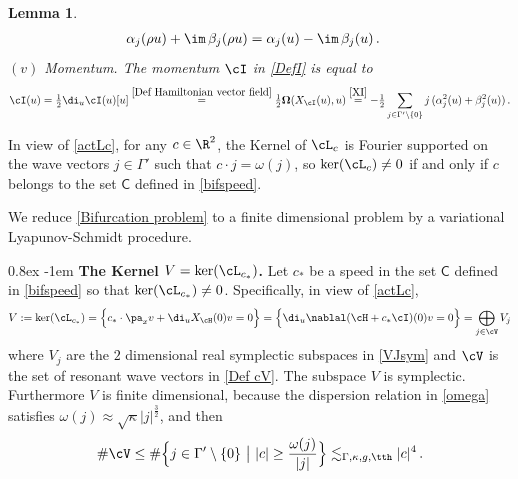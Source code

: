 \documentclass[11pt,a4paper,reqno]{article}
\makeatletter
\renewcommand{\paragraph}{%
  \@startsection{paragraph}{4}{\z@}%
  {0.8ex}  %
  {-1em}   %
  {\normalfont\bfseries}%
}
\numberwithin{equation}{section}
\newtheorem{lemma}[theorem]{Lemma}
\theoremstyle{definition}
\makeatother
\begin{document}
\begin{lemma}
\begin{equation}
\begin{aligned}
            &\alpha_j(\rho u)+\im \, \beta_j(\rho u)=
            \alpha_j(u) - \im \, \beta_j(u) \, .
        \end{aligned}
         \end{equation} 
$(v)$ {\sc Momentum.} The momentum 
        $ \cI $ in \eqref{DefI} is equal to
        \begin{equation}\label{Momuntum in coordinates}
                \cI(u)= \tfrac12 \di_u \cI(u) [u] 
                \stackrel{\eqref{Def Hamiltonian vector field}} = \tfrac 12 {\bf \Omega} (X_{\cI}(u),u)\stackrel{\eqref{XI}}=-\tfrac12 \sum_{j\in \Gamma'\setminus\{0\}} j \, (\alpha_j^2(u)+\beta_j^2(u)) \, .
        \end{equation}
\end{lemma}

In view of \eqref{actLc}, for any $c \in \R^2 $,  the Kernel of $ \cL_c $
is Fourier supported on the wave vectors 
$ j \in \Gamma' $ such that 
$ c \cdot j = \omega (j) $,  so 
$ \ker(\cL_{c})\not=0$ if and only if 
$ c $ belongs to the set $ \mathsf C $  defined in  \eqref{bifspeed}. 


\smallskip 
We reduce  \eqref{Bifurcation problem} to a finite dimensional problem by a variational Lyapunov-Schmidt procedure.

\paragraph{\bf The Kernel $ V = \ker(\cL_{c_*}) $.}
Let $ c_* $ be a speed in the set $ \mathsf C $ defined in \eqref{bifspeed} so that 
$ \ker(\cL_{c_*})\not=0$. Specifically, in view of 
\eqref{actLc}, 
\begin{equation}
\label{defKer}
V := \ker(\cL_{c_*}) = 
\Big\{ c_* \cdot \pa_x v +
   \di_u X_\cH (0) v = 0 \Big\}  =
  \Big\{  
   \di_u \nablal  (\cH + c_* \cI)  
  (0) v = 0 \Big\} = 
\bigoplus_{j \in \cV} 
V_j 
\end{equation}
where 
$ V_j $
are the $2$ dimensional real  symplectic subspaces in \eqref{VJsym} and $ \cV $ is the set of resonant wave vectors
in \eqref{Def cV}. The subspace  
$V $ is  symplectic. 
Furthermore $ V $ is finite dimensional, because 
the dispersion relation  in 
\eqref{omega} satisfies 
$\omega(j)\approx \sqrt{\kappa} |j|^{\frac32}$,  and then
    \begin{equation}\label{count of Js}
    \# \cV   \leq \#\Big\{j \in \Gamma'\setminus\{0\} \ \big| \   |c|\geq \frac{\omega(j)}{|j|}\Big\}\lesssim_{\Gamma,\kappa,g,\tth} |c|^{4}\, .
    \end{equation}
    
\end{document}
